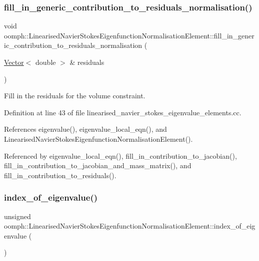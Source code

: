 \subsubsection{\texorpdfstring{fill\+\_\+in\+\_\+generic\+\_\+contribution\+\_\+to\+\_\+residuals\+\_\+normalisation()}{fill\_in\_generic\_contribution\_to\_residuals\_normalisation()}}
{\footnotesize\ttfamily void oomph\+::\+Linearised\+Navier\+Stokes\+Eigenfunction\+Normalisation\+Element\+::fill\+\_\+in\+\_\+generic\+\_\+contribution\+\_\+to\+\_\+residuals\+\_\+normalisation (\begin{DoxyParamCaption}\item[{\hyperlink{classoomph_1_1Vector}{Vector}$<$ double $>$ \&}]{residuals }\end{DoxyParamCaption})\hspace{0.3cm}{\ttfamily [private]}}



Fill in the residuals for the volume constraint. 



Definition at line 43 of file linearised\+\_\+navier\+\_\+stokes\+\_\+eigenvalue\+\_\+elements.\+cc.



References eigenvalue(), eigenvalue\+\_\+local\+\_\+eqn(), and Linearised\+Navier\+Stokes\+Eigenfunction\+Normalisation\+Element().



Referenced by eigenvalue\+\_\+local\+\_\+eqn(), fill\+\_\+in\+\_\+contribution\+\_\+to\+\_\+jacobian(), fill\+\_\+in\+\_\+contribution\+\_\+to\+\_\+jacobian\+\_\+and\+\_\+mass\+\_\+matrix(), and fill\+\_\+in\+\_\+contribution\+\_\+to\+\_\+residuals().

\mbox{\label{classoomph_1_1LinearisedNavierStokesEigenfunctionNormalisationElement_ac1eefe59911c0f64b40f31a040b1775a}} 
\subsubsection{\texorpdfstring{index\+\_\+of\+\_\+eigenvalue()}{index\_of\_eigenvalue()}}
{\footnotesize\ttfamily unsigned oomph\+::\+Linearised\+Navier\+Stokes\+Eigenfunction\+Normalisation\+Element\+::index\+\_\+of\+\_\+eigenvalue (\begin{DoxyParamCaption}{ }\end{DoxyParamCaption})\hspace{0.3cm}{\ttfamily [inline]}}



